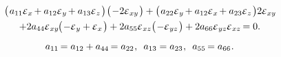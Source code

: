 {\vspace{-0.25em}\noindent
\begin{gather*}
\bigl( \hspace{.2ex}
a_{11} \mathepsilon_{x} \hspace{-.2ex}
+ a_{12} \mathepsilon_{y} \hspace{-.2ex}
+ a_{13} \mathepsilon_{z} \hspace{.2ex} \bigr) \hspace{.2ex}
\bigl( \hspace{.2ex}
- 2 \mathepsilon_{xy}
\hspace{.2ex} \bigr)
+ \bigl( \hspace{.2ex}
a_{22} \mathepsilon_{y} \hspace{-.2ex}
+ a_{12} \mathepsilon_{x} \hspace{-.2ex}
+ a_{23} \mathepsilon_{z}
\hspace{.2ex} \bigr)
2 \mathepsilon_{xy} \hspace{-.2ex}
\\
%
+ 2 a_{44} \mathepsilon_{xy} \hspace{-.2ex}
\bigl( \hspace{.2ex} - \mathepsilon_y + \mathepsilon_x \hspace{.2ex} \bigr)
+ 2 a_{55} \mathepsilon_{xz}
\bigl( \hspace{.2ex} - \mathepsilon_{yz} \hspace{.2ex} \bigr)
+ 2 a_{66} \mathepsilon_{yz} \mathepsilon_{xz} \hspace{-.2ex}
= 0
.
\end{gather*}

\noindent
{}

\vspace{-0.25em}\noindent
\begin{equation*}
a_{11} \hspace{-.2ex} = a_{12} + a_{44} \hspace{-.2ex} = a_{22}
\hspace{.1ex} ,
\hspace{.5em}
a_{13} = a_{23}
\hspace{.1ex} ,
\hspace{.5em}
a_{55} \hspace{-.2ex} = a_{66}
\hspace{.1ex} .
\end{equation*}


}
